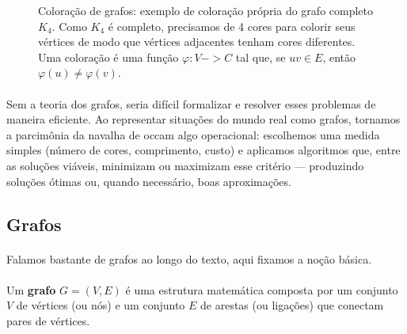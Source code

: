 \documentclass[12pt,a4paper]{article}
\def\emph#1{#1}%
\def\to{->}%
\begin{document}
\begin{figure}[H]
\centering
{}
\caption{Coloração de grafos: exemplo de coloração própria do grafo completo $K_4$. Como $K_4$ é completo, precisamos de 4 cores para colorir seus vértices de modo que vértices adjacentes tenham cores diferentes. Uma coloração é uma função $\varphi:V\to C$ tal que, se $uv\in E$, então $\varphi(u)\neq\varphi(v)$.}
\label{fig:coloracao}
\end{figure}

\paragraph{}
Sem a teoria dos grafos, seria difícil formalizar e resolver esses problemas de maneira eficiente. Ao representar situações do mundo real como grafos, tornamos a parcimônia da navalha de occam algo operacional: escolhemos uma medida simples (número de cores, comprimento, custo) e aplicamos algoritmos que, entre as soluções viáveis, minimizam ou maximizam esse critério — produzindo soluções ótimas ou, quando necessário, boas aproximações.

\subsection{Grafos}
\paragraph{}
Falamos bastante de grafos ao longo do texto, aqui fixamos a noção básica. 

\paragraph{}
Um \textbf{grafo} \(G = (V, E)\) é uma estrutura matemática composta por um conjunto \(V\) de \emph{vértices} (ou \emph{nós}) e um conjunto \(E\) de \emph{arestas} (ou \emph{ligações}) que conectam pares de vértices. 
\end{document}
